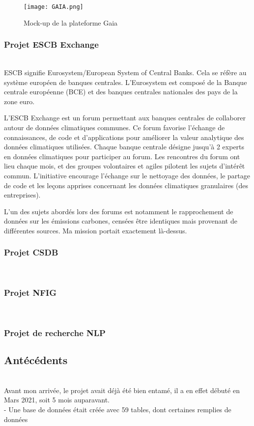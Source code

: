 \begin{figure}[H]
    \centering
    \texttt{[image: GAIA.png]}
    \caption{Mock-up de la plateforme Gaia}
\end{figure}

\subsubsection{Projet ESCB Exchange}
~\\

ESCB signifie Eurosystem/European System of Central Banks. Cela se réfère au système européen de banques centrales. 
L'Eurosystem est composé de la Banque centrale européenne (BCE) et des banques centrales nationales des pays de la zone euro. 

L'ESCB Exchange est un forum permettant aux banques centrales de collaborer autour de données climatiques communes. 
Ce forum favorise l'échange de connaissances, de code et d'applications pour améliorer la valeur analytique des données climatiques utilisées. 
Chaque banque centrale désigne jusqu'à 2 experts en données climatiques pour participer au forum. 
Les rencontres du forum ont lieu chaque mois, et des groupes volontaires et agiles pilotent les sujets d'intérêt commun. 
L'initiative encourage l'échange sur le nettoyage des données, le partage de code et les leçons apprises concernant les données climatiques granulaires (des entreprises).

L'un des sujets abordés lors des forums est notamment le rapprochement de données sur les émissions carbones, censées être identiques mais provenant de différentes sources.
Ma mission portait exactement là-dessus.
\subsubsection{Projet CSDB}
~\\
\subsubsection{Projet NFIG}
~\\
\subsubsection{Projet de recherche NLP}


\pagebreak
\subsection{Antécédents}
~\\
Avant mon arrivée, le projet avait déjà été bien entamé, il a en effet débuté en Mars 2021, soit 5 mois auparavant. \\
- Une base de données était créée avec 59 tables, dont certaines remplies de données \\

